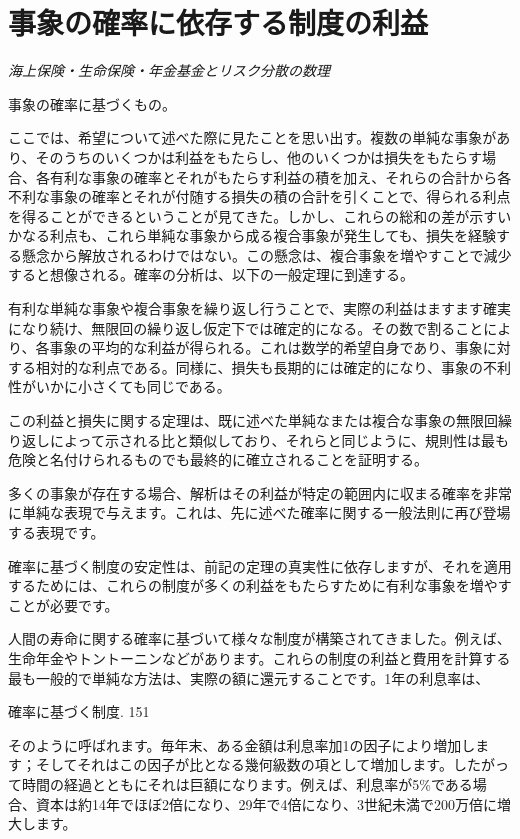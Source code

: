 \documentclass[a4paper,11pt,openany]{ltjsbook}
\begin{document}
\newpage

\chapter{事象の確率に依存する制度の利益}
\label{ch:xv}

\begin{center}
\large\textit{海上保険・生命保険・年金基金とリスク分散の数理}
\end{center}
\vspace{4mm}

事象の確率に基づくもの。

ここでは、希望について述べた際に見たことを思い出す。複数の単純な事象があり、そのうちのいくつかは利益をもたらし、他のいくつかは損失をもたらす場合、各有利な事象の確率とそれがもたらす利益の積を加え、それらの合計から各不利な事象の確率とそれが付随する損失の積の合計を引くことで、得られる利点を得ることができるということが見てきた。しかし、これらの総和の差が示すいかなる利点も、これら単純な事象から成る複合事象が発生しても、損失を経験する懸念から解放されるわけではない。この懸念は、複合事象を増やすことで減少すると想像される。確率の分析は、以下の一般定理に到達する。

有利な単純な事象や複合事象を繰り返し行うことで、実際の利益はますます確実になり続け、無限回の繰り返し仮定下では確定的になる。その数で割ることにより、各事象の平均的な利益が得られる。これは数学的希望自身であり、事象に対する相対的な利点である。同様に、損失も長期的には確定的になり、事象の不利性がいかに小さくても同じである。

この利益と損失に関する定理は、既に述べた単純なまたは複合な事象の無限回繰り返しによって示される比と類似しており、それらと同じように、規則性は最も危険と名付けられるものでも最終的に確立されることを証明する。

多くの事象が存在する場合、解析はその利益が特定の範囲内に収まる確率を非常に単純な表現で与えます。これは、先に述べた確率に関する一般法則に再び登場する表現です。

確率に基づく制度の安定性は、前記の定理の真実性に依存しますが、それを適用するためには、これらの制度が多くの利益をもたらすために有利な事象を増やすことが必要です。

人間の寿命に関する確率に基づいて様々な制度が構築されてきました。例えば、生命年金やトントーニンなどがあります。これらの制度の利益と費用を計算する最も一般的で単純な方法は、実際の額に還元することです。1年の利息率は、

確率に基づく制度. 151

そのように呼ばれます。毎年末、ある金額は利息率加1の因子により増加します；そしてそれはこの因子が比となる幾何級数の項として増加します。したがって時間の経過とともにそれは巨額になります。例えば、利息率が5\%である場合、資本は約14年でほぼ2倍になり、29年で4倍になり、3世紀未満で200万倍に増大します。
\end{document}
